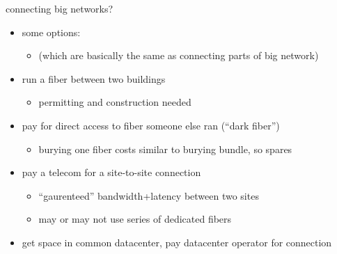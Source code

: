 \begin{frame}{connecting big networks?}
    \begin{itemize}
    \item some options:
        \begin{itemize}
        \item (which are basically the same as connecting parts of big network)
        \end{itemize}
    \vspace{.25cm}
    \item run a fiber between two buildings
        \begin{itemize}
        \item permitting and construction needed
        \end{itemize}
    \item pay for direct access to fiber someone else ran (``dark fiber'')
        \begin{itemize}
        \item burying one fiber costs similar to burying bundle, so spares
        \end{itemize}
    \item pay a telecom for a site-to-site connection
        \begin{itemize}
        \item ``gaurenteed'' bandwidth+latency between two sites
        \item may or may not use series of dedicated fibers
        \end{itemize}
    \item get space in common datacenter, pay datacenter operator for connection 
    \end{itemize}
\end{frame}
